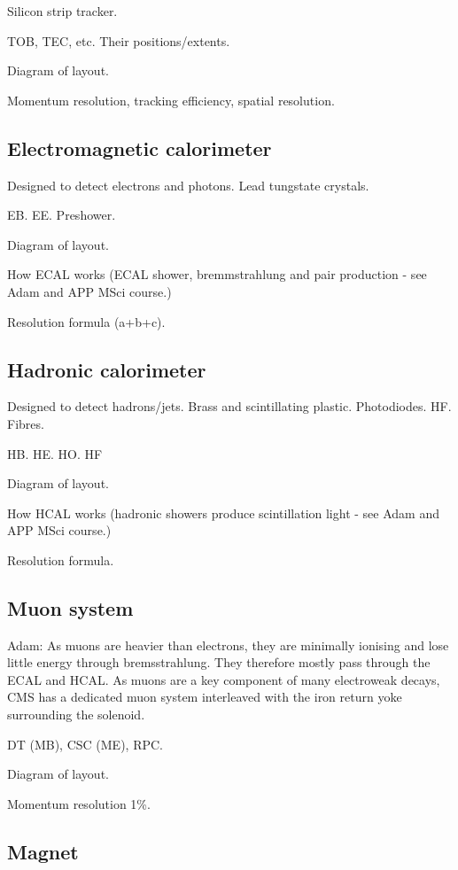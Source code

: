 Silicon strip tracker.

TOB, TEC, etc. Their positions/extents.

Diagram of layout.

Momentum resolution, tracking efficiency, spatial resolution.

\subsection{Electromagnetic calorimeter}

Designed to detect electrons and photons. Lead tungstate crystals.

EB. EE. Preshower.

Diagram of layout.

How ECAL works (ECAL shower, bremmstrahlung and pair production - see Adam and 
APP MSci course.)

Resolution formula (a+b+c).

\subsection{Hadronic calorimeter}

Designed to detect hadrons/jets. Brass and scintillating plastic. Photodiodes. 
HF. Fibres.

HB. HE. HO. HF

Diagram of layout.

How HCAL works (hadronic showers produce scintillation light - see Adam and APP 
MSci course.)

Resolution formula.

\subsection{Muon system}

Adam: As muons are heavier than electrons, they are minimally ionising and lose 
little energy through bremsstrahlung. They therefore mostly pass through the 
ECAL and HCAL. As muons are a key component of many electroweak decays, CMS has 
a dedicated muon system interleaved with the iron return yoke surrounding the 
solenoid.
 
DT (MB), CSC (ME), RPC.

Diagram of layout.

Momentum resolution 1\%.

\subsection{Magnet}


